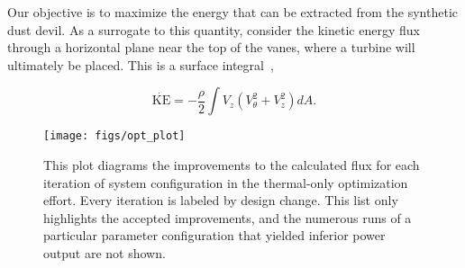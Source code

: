 Our objective is to maximize the energy that can be 
extracted from the synthetic dust devil. As a surrogate to this
quantity, consider the kinetic energy flux through a horizontal plane
near the top of the vanes, where a turbine will ultimately be
placed. This is a surface integral~\cite{landau1959fm},

%
%
%



 \begin{equation}
  \dot{ \text{KE}} = -\frac{\rho }{2} \int V_z (V_{\theta}^2 + V_z^2 ) dA.
 \end{equation}

\begin{figure}[htb]
 \centering
 \texttt{[image: figs/opt\_plot]}
 \caption{This plot diagrams the improvements to the calculated flux for  
 each iteration of system configuration in the thermal-only optimization
 effort. Every iteration is labeled by design change. This list
 only highlights the accepted improvements, and the numerous runs of a
 particular parameter configuration that yielded inferior power output
 are not shown. }
 \label{fig:opt_plot}
\end{figure}






